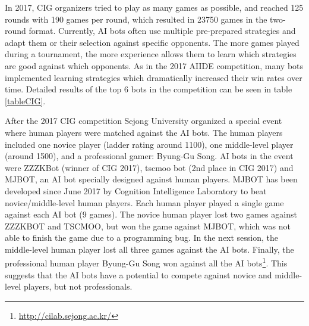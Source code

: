In 2017, CIG organizers tried to play as many games as possible, and reached 125 rounds with 190 games per round, which resulted in 23750 games in the two-round format. Currently, AI bots often use multiple pre-prepared strategies and adapt them or their selection against specific opponents. The more games played during a tournament, the more experience allows them to learn which strategies are good against which opponents. As in the 2017 AIIDE competition, many bots implemented learning strategies which dramatically increased their win rates over time. Detailed results of the top 6 bots in the competition can be seen in table \ref{tableCIG}.

After the 2017 CIG competition Sejong University organized a special event where human players were matched against the AI bots. The human players included one novice player (ladder rating around 1100), one middle-level player (around 1500), and a professional gamer: Byung-Gu Song. AI bots in the event were ZZZKBot (winner of CIG 2017), tscmoo bot (2nd place in CIG 2017) and MJBOT, an AI bot specially designed against human players. MJBOT has been developed since June 2017 by Cognition Intelligence Laboratory to beat novice/middle-level human players. Each human player played a single game against each AI bot (9 games). The novice human player lost two games against ZZZKBOT and TSCMOO, but won the game against MJBOT, which was not able to finish the game due to a programming bug. In the next session, the middle-level human player lost all three games against the AI bots. Finally, the professional human player Byung-Gu Song won against all the AI bots\footnote{\url{http://cilab.sejong.ac.kr/}}. This suggests that the AI bots have a potential to compete against novice and middle-level players, but not professionals. 

